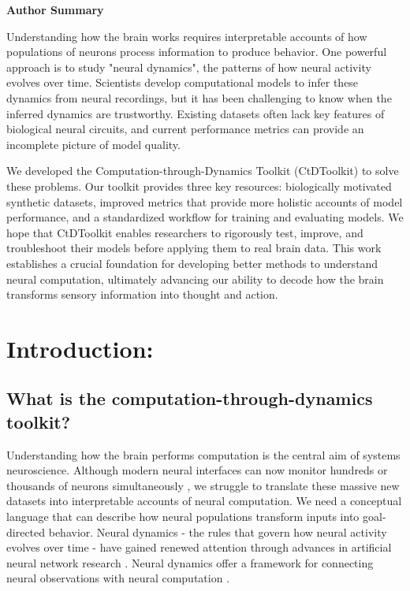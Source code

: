 \documentclass{article}
\begin{document}
\vspace{0.3cm}
\noindent\textbf{Author Summary}

\noindent Understanding how the brain works requires interpretable accounts of how populations of neurons process information to produce behavior. One powerful approach is to study "neural dynamics", the patterns of how neural activity evolves over time. Scientists develop computational models to infer these dynamics from neural recordings, but it has been challenging to know when the inferred dynamics are trustworthy. Existing datasets often lack key features of biological neural circuits, and current performance metrics can provide an incomplete picture of model quality.

We developed the Computation-through-Dynamics Toolkit (CtDToolkit) to solve these problems. Our toolkit provides three key resources: biologically motivated synthetic datasets, improved metrics that provide more holistic accounts of model performance, and a standardized workflow for training and evaluating models. We hope that CtDToolkit enables researchers to rigorously test, improve, and troubleshoot their models before applying them to real brain data. This work establishes a crucial foundation for developing better methods to understand neural computation, ultimately advancing our ability to decode how the brain transforms sensory information into thought and action.

\newpage

\vspace{-0.7cm}
\section{Introduction:}
\vspace{-0.3cm}
\subsection{What is the computation-through-dynamics toolkit?}
\vspace{-0.3cm}

Understanding how the brain performs computation is the central aim of systems neuroscience. Although modern neural interfaces can now monitor hundreds or thousands of neurons simultaneously \cite{stevenson2011advances}, we struggle to translate these massive new datasets into interpretable accounts of neural computation. We need a conceptual language that can describe how neural populations transform inputs into goal-directed behavior. Neural dynamics - the rules that govern how neural activity evolves over time - have gained renewed attention through advances in artificial neural network research \cite{brown1911intrinsic,hopfield1982neural, mazor2005transient, sussillo_opening_2013}. Neural dynamics offer a framework for connecting neural observations with neural computation \cite{vyas_computation_2020}.
\end{document}
